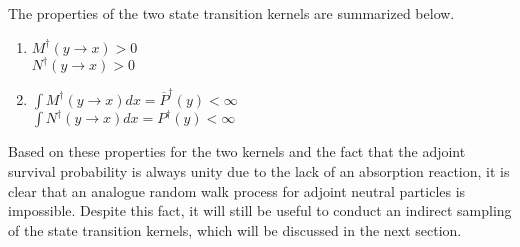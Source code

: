 The properties of the two state transition kernels are summarized below. 
\begin{enumerate}
  \item $M^{\dagger}(y \to x) > 0$ \\
    $N^{\dagger}(y \to x) > 0$
  \item $\int M^{\dagger}(y \to x)dx = \overline{P}^{\dagger}(y) < \infty$ \\
    $\int N^{\dagger}(y \to x)dx = P^{\dagger}(y) < \infty$
\end{enumerate}

Based on these properties for the two kernels and the fact that the adjoint
survival probability is always unity due to the lack of an absorption reaction,
it is clear that an analogue random walk process for adjoint neutral particles 
is impossible. Despite this fact, it will still be useful to conduct an 
indirect sampling of the state transition kernels, which will be discussed in
the next section. 

